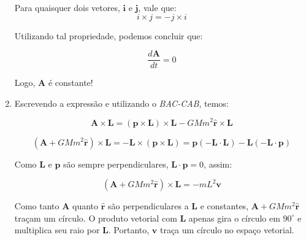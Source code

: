 \documentclass[11pt]{article}
\begin{document}
\begin{pproblem}
\begin{pssolution*}{}{}
\begin{enumerate}[label=\textbf{\Roman*.}]
            Para quaisquer dois vetores, \(\mathbf{i}\) e \(\mathbf{j}\), vale que:
            \[i\times j = -j\times i\]

            Utilizando tal propriedade, podemos concluir que:

            \[\boxed{\frac{d\mathbf{A}}{dt} = 0}\]

            Logo, \(\mathbf{A}\) é constante!

            \item Escrevendo a expressão e utilizando o \textit{BAC-CAB}, temos:
            
            \[\mathbf{A}\times\mathbf{L} = (\mathbf{p}\times\mathbf{L})\times\mathbf{L} - GMm^2\mathbf{\hat{r}}\times\mathbf{L}\]

            \[(\mathbf{A} +GMm^2\mathbf{\hat{r}})\times\mathbf{L} = - \mathbf{L}\times(\mathbf{p}\times\mathbf{L}) = \mathbf{p}(-\mathbf{L}\cdot\mathbf{L})-\mathbf{L}(-\mathbf{L}\cdot\mathbf{p})\]

            Como \(\mathbf{L}\) e \(\mathbf{p}\) são sempre perpendiculares, \(\mathbf{L}\cdot\mathbf{p}=0\), assim:

            \[(\mathbf{A}+GMm^2\mathbf{\hat{r}})\times\mathbf{L} = -mL^2\mathbf{v}\]

            Como tanto \(\mathbf{A}\) quanto \(\mathbf{\hat{r}}\) são perpendiculares a \(\mathbf{L}\) e constantes, \(\mathbf{A}+GMm^2\mathbf{\hat{r}}\) traçam um círculo. O produto vetorial com \(\mathbf{L}\) apenas gira o círculo em \(90^\circ\) e multiplica seu raio por \(\mathbf{L}\). Portanto, \(\mathbf{v}\) traça um círculo no espaço vetorial.
            
        \end{enumerate}
    \end{pssolution*}
\end{pproblem}
\end{document}
